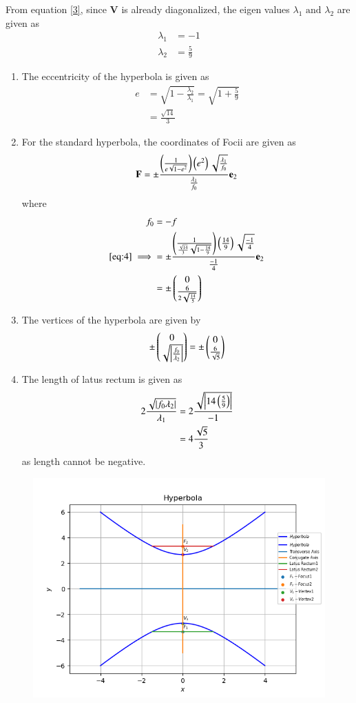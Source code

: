 \documentclass[journal,12pt,twocolumn]{IEEEtran}
\renewcommand{\vec}[1]{\boldsymbol{\mathbf{#1}}}
\begin{document}
From equation \eqref{3}, since $\vec{V}$ is already diagonalized, the eigen values $\lambda_1 \text{ and } \lambda_2$ are given as
\begin{align}
	\lambda_1 &= -1\\
	\lambda_2 &= \frac{5}{9}
\end{align}
\begin{enumerate}
\item The eccentricity of the hyperbola is given as
\begin{align}
	e &= \sqrt{1 - \frac{\lambda_2}{\lambda_1}} = \sqrt{1+\frac{5}{9}}\\
	  &= \frac{\sqrt{14}}{3}
\end{align}
\item For the standard hyperbola, the coordinates of Focii are given as
\begin{align}
	\label{eq:4}
	\vec{F} = \pm \frac{\brak{\frac{1}{e\sqrt{1-e^2}}}\brak{e^2}\sqrt{\frac{\lambda_1}{f_0}}}{\frac{\lambda_1}{f_0}} \vec{e}_2
\end{align}
where
\begin{align}
	f_0 &= -f\\
	\eqref{eq:4} \implies &= \pm \frac{\brak{\frac{1}{\frac{\sqrt{14}}{3}\sqrt{1-\frac{14}{9}}}}\brak{\frac{14}{9}}\sqrt{\frac{-1}{4}}}{\frac{-1}{4}} \vec{e}_2\\
	&= \pm \myvec{0\\\frac{6}{2\sqrt{\frac{14}{5}}}}
\end{align}
\item The vertices of the hyperbola are given by
\begin{align}
	\pm \begin{pmatrix}0\\\sqrt{\left\vert\frac{f_0}{\lambda_2}\right\vert}\end{pmatrix}= \pm \begin{pmatrix}0\\\frac{6}{\sqrt{5}}\end{pmatrix}
\end{align}
\item The length of latus rectum is given as
\begin{align}
	2\frac{\sqrt{\left\vert f_0 \lambda_2\right\vert}}{\lambda_1} &= 2\frac{\sqrt{\left\vert14\left(\frac{5}{9}\right)\right\vert}}{-1}\\
	&= 4\frac{\sqrt{5}}{3}
\end{align}
as length cannot be negative.
\end{enumerate}

\begin{figure}[!h]
	\begin{center} 
	    \includegraphics[width=\columnwidth]{figs/hyperbola.png}
	\end{center}
\caption{}
\label{fig:1}
\end{figure}
\end{document}
